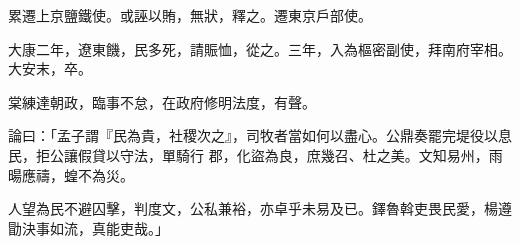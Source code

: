 \begin{pinyinscope}
 累遷上京鹽鐵使。或誣以賄，無狀，釋之。遷東京戶部使。



 大康二年，遼東饑，民多死，請賑恤，從之。三年，入為樞密副使，拜南府宰相。大安末，卒。



 棠練達朝政，臨事不怠，在政府修明法度，有聲。



 論曰：「孟子謂『民為貴，社稷次之』，司牧者當如何以盡心。公鼎奏罷完堤役以息民，拒公讓假貸以守法，單騎行
 郡，化盜為良，庶幾召、杜之美。文知易州，雨暘應禱，蝗不為災。



 人望為民不避囚擊，判度文，公私兼裕，亦卓乎未易及已。鐸魯斡吏畏民愛，楊遵勖決事如流，真能吏哉。」



\end{pinyinscope}